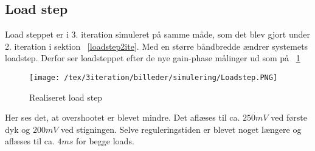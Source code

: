 \subsection{Load step}
Load steppet er i 3. iteration simuleret på samme måde, som det blev gjort under 2. iteration i sektion ~\ref{loadstep2ite}. Med en større båndbredde ændrer systemets loadstep. Derfor ser loadsteppet efter de nye gain-phase målinger ud som på ~\ref{fig:Loadstepsim2}
\begin{figure}[H]
	\center
	\texttt{[image: /tex/3iteration/billeder/simulering/Loadstep.PNG]}
	\caption{Realiseret load step}
	\label{fig:Loadstepsim2}
\end{figure} 
Her ses det, at overshootet er blevet mindre. Det aflæses til ca. $250mV$ ved første dyk og $200mV$ ved stigningen. Selve reguleringstiden er blevet noget længere og aflæses til ca. $4ms$ for begge loads.  
